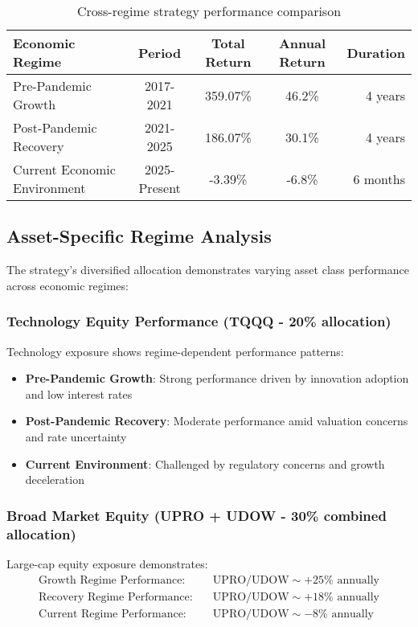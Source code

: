 \documentclass[onecolumn,ieee]{arithmaxresearch}
\begin{document}
\begin{table}[h]
\centering
\begin{tabular}{lcccr}
\toprule
\textbf{Economic Regime} & \textbf{Period} & \textbf{Total Return} & \textbf{Annual Return} & \textbf{Duration} \\
\midrule
Pre-Pandemic Growth & 2017-2021 & 359.07\% & 46.2\% & 4 years \\
Post-Pandemic Recovery & 2021-2025 & 186.07\% & 30.1\% & 4 years \\
Current Economic Environment & 2025-Present & -3.39\% & -6.8\% & 6 months \\
\bottomrule
\end{tabular}
\caption{Cross-regime strategy performance comparison}
\label{tab:regime_performance}
\end{table}

\subsection{Asset-Specific Regime Analysis}

The strategy's diversified allocation demonstrates varying asset class performance across economic regimes:

\subsubsection{Technology Equity Performance (TQQQ - 20\% allocation)}

Technology exposure shows regime-dependent performance patterns:
\begin{itemize}
    \item \textbf{Pre-Pandemic Growth}: Strong performance driven by innovation adoption and low interest rates
    \item \textbf{Post-Pandemic Recovery}: Moderate performance amid valuation concerns and rate uncertainty
    \item \textbf{Current Environment}: Challenged by regulatory concerns and growth deceleration
\end{itemize}

\subsubsection{Broad Market Equity (UPRO + UDOW - 30\% combined allocation)}

Large-cap equity exposure demonstrates:
\begin{align}
\text{Growth Regime Performance:} &\quad \text{UPRO/UDOW} \sim +25\% \text{ annually} \\
\text{Recovery Regime Performance:} &\quad \text{UPRO/UDOW} \sim +18\% \text{ annually} \\
\text{Current Regime Performance:} &\quad \text{UPRO/UDOW} \sim -8\% \text{ annually}
\end{align}
\end{document}

